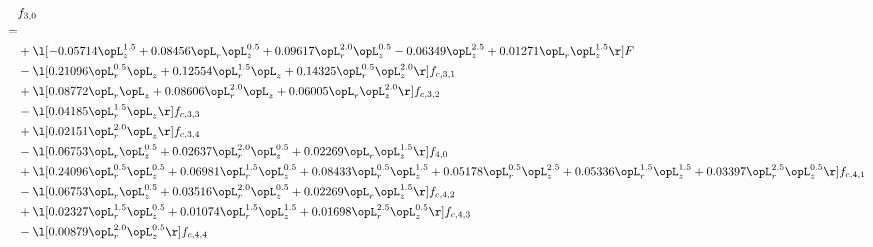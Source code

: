 \begin{alignat}{2} 
\label{eq:f_30_2} 
& f_{3,0} \nonumber \\ 
 = \\ 
& + \l[  -0.05714 \opL_z^{1.5} +  0.08456 \opL_r \opL_z^{0.5} +  0.09617 \opL_r^{2.0} \opL_z^{0.5}   -0.06349 \opL_z^{2.5} +  0.01271 \opL_r \opL_z^{1.5}  \r] F \nonumber \\ 
& - \l[  0.21096 \opL_r^{0.5} \opL_z +  0.12554 \opL_r^{1.5} \opL_z +  0.14325 \opL_r^{0.5} \opL_z^{2.0}  \r] f_{c,3,1} \nonumber \\ 
& + \l[  0.08772 \opL_r \opL_z +  0.08606 \opL_r^{2.0} \opL_z +  0.06005 \opL_r \opL_z^{2.0}  \r] f_{c,3,2} \nonumber \\ 
& - \l[  0.04185 \opL_r^{1.5} \opL_z  \r] f_{c,3,3} \nonumber \\ 
& + \l[  0.02151 \opL_r^{2.0} \opL_z  \r] f_{c,3,4} \nonumber \\ 
& - \l[  0.06753 \opL_r \opL_z^{0.5} +  0.02637 \opL_r^{2.0} \opL_z^{0.5} +  0.02269 \opL_r \opL_z^{1.5}  \r] f_{4,0} \nonumber \\ 
& + \l[  0.24096 \opL_r^{0.5} \opL_z^{0.5} +  0.06981 \opL_r^{1.5} \opL_z^{0.5} +  0.08433 \opL_r^{0.5} \opL_z^{1.5} +  0.05178 \opL_r^{0.5} \opL_z^{2.5} +  0.05336 \opL_r^{1.5} \opL_z^{1.5} +  0.03397 \opL_r^{2.5} \opL_z^{0.5}  \r] f_{c,4,1} \nonumber \\ 
& - \l[  0.06753 \opL_r \opL_z^{0.5} +  0.03516 \opL_r^{2.0} \opL_z^{0.5} +  0.02269 \opL_r \opL_z^{1.5}  \r] f_{c,4,2} \nonumber \\ 
& + \l[  0.02327 \opL_r^{1.5} \opL_z^{0.5} +  0.01074 \opL_r^{1.5} \opL_z^{1.5} +  0.01698 \opL_r^{2.5} \opL_z^{0.5}  \r] f_{c,4,3} \nonumber \\ 
& - \l[  0.00879 \opL_r^{2.0} \opL_z^{0.5}  \r] f_{c,4,4} \nonumber \\ 
\end{alignat} 


